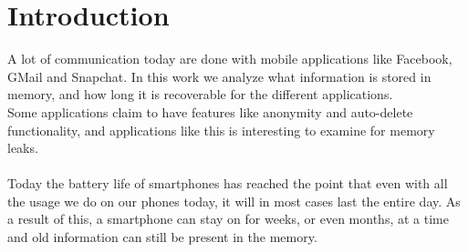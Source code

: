 \section{Introduction}
A lot of communication today are done with mobile applications like Facebook, GMail and Snapchat. In this work we analyze what information is stored in memory, and how long it is recoverable for the different applications. \\
Some applications claim to have features like anonymity and auto-delete functionality, and applications like this is interesting to examine for memory leaks. \\ \\
Today the battery life of smartphones has reached the point that even with all the usage we do on our phones today, it will in most cases last the entire day. As a result of this, a smartphone can stay on for weeks, or even months, at a time and old information can still be present in the memory. 